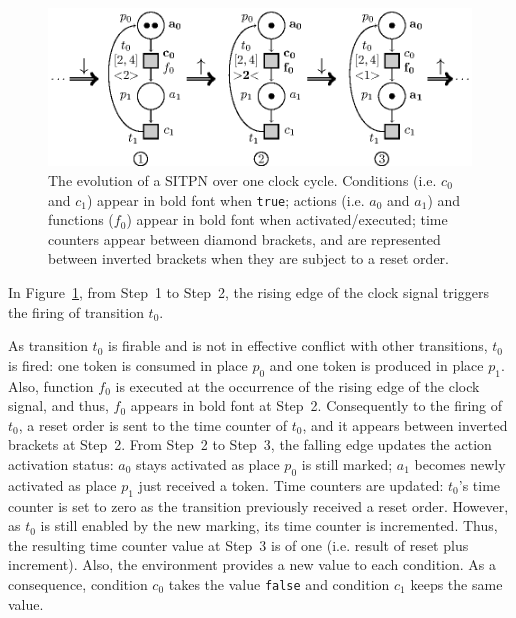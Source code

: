 \begin{figure}[H]
  \centering
  \includegraphics[keepaspectratio=true, width=.9\textwidth]{sitpn-state-evol.eps}
  \caption[Evolution of an SITPN over one clock cycle.]{The evolution
    of a SITPN over one clock cycle. Conditions (i.e. $c_0$ and $c_1$)
    appear in bold font when \texttt{true}; actions (i.e. $a_0$ and
    $a_1$) and functions ($f_0$) appear in bold font when
    activated/executed; time counters appear between diamond brackets,
    and are represented between inverted brackets when they are
    subject to a reset order.}
  \label{fig:sitpn-state-exec}
\end{figure}

In Figure~\ref{fig:sitpn-state-exec}, from Step~1 to Step~2, the
rising edge of the clock signal triggers the firing of transition
$t_0$. %



As transition $t_0$ is firable and is not in effective conflict with
other transitions, $t_0$ is fired: one token is consumed in place
$p_0$ and one token is produced in place $p_1$. Also, function $f_0$
is executed at the occurrence of the rising edge of the clock signal,
and thus, $f_0$ appears in bold font at Step~2. Consequently to the
firing of $t_0$, a reset order is sent to the time counter of $t_0$,
and it appears between inverted brackets at Step~2. From Step~2 to
Step~3, the falling edge updates the action activation status: $a_0$
stays activated as place $p_0$ is still marked; $a_1$ becomes newly
activated as place $p_1$ just received a token. Time counters are
updated: $t_0$'s time counter is set to zero as the transition
previously received a reset order. However, as $t_0$ is still enabled
by the new marking, its time counter is incremented. Thus, the
resulting time counter value at Step~3 is of one (i.e. result of reset
plus increment). Also, the environment provides a new value to each
condition. As a consequence, condition $c_0$ takes the value
\texttt{false} and condition $c_1$ keeps the same value.


